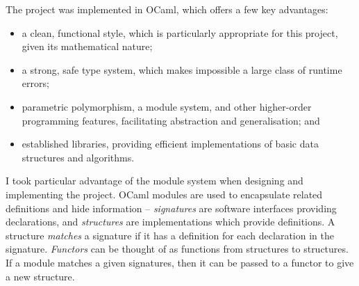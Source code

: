 \documentclass[12pt,a4paper,twoside,openright]{report}
\begin{document}
The project was implemented in OCaml, which
offers a few key advantages:
\begin{itemize}
	\item a clean, functional
	style, which is particularly appropriate for
	this project, given its mathematical nature;
	\item a strong, safe type system, which makes
	impossible a large class of runtime errors;
	\item parametric polymorphism, a module system,
	and other higher-order programming features,
	facilitating abstraction and generalisation; and
	\item established libraries, providing efficient
	implementations of basic data structures and algorithms.
\end{itemize}
I took particular advantage of the module system when
designing and implementing the project. OCaml modules
are used to encapsulate related definitions and hide
information -- \emph{signatures} are software interfaces
providing declarations,
and \emph{structures} are implementations which 
provide definitions. A structure \emph{matches} a
signature if it has a definition for each declaration
in the signature. \emph{Functors} can be thought of
as functions from structures to structures. If a
module matches a given signatures, then it can be
passed to a functor to give a new structure.
\end{document}

